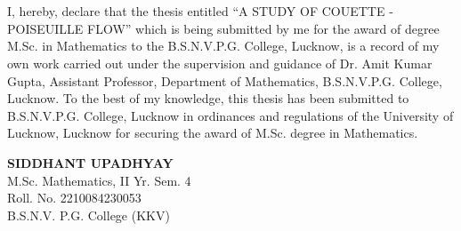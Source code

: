 \documentclass[14pt,one side, a4paper]{extbook}
\begin{document}
			\chapter*{} 
			\begin{Large}
				I, hereby, declare that the thesis entitled “A STUDY OF COUETTE -  POISEUILLE FLOW”  which is being submitted by me for the award of degree M.Sc. in Mathematics to the B.S.N.V.P.G. College, Lucknow, is a record of my own work carried out under the supervision and guidance of Dr. Amit Kumar Gupta, Assistant Professor, Department of Mathematics, B.S.N.V.P.G. College, Lucknow. To the best of my knowledge, this thesis has been submitted to B.S.N.V.P.G. College, Lucknow in ordinances and regulations of the University of Lucknow, Lucknow for securing the award of M.Sc. degree in Mathematics.
				\end{Large}
				\vspace{4cm}
				\begin{flushright}
					\textbf{SIDDHANT UPADHYAY}\\M.Sc. Mathematics, II Yr. Sem. 4\\Roll. No. 2210084230053\\B.S.N.V. P.G. College (KKV)
					\end{flushright}	
\end{document}
